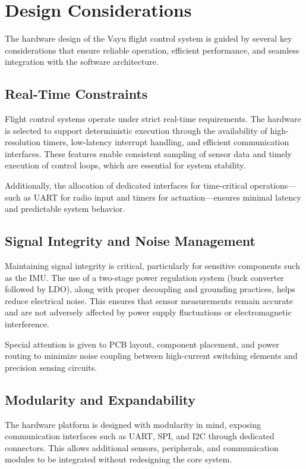 \section{Design Considerations}
\label{sec:hw_design}

The hardware design of the Vayu flight control system is guided by several key considerations that ensure reliable operation, efficient performance, and seamless integration with the software architecture.

\subsection{Real-Time Constraints}

Flight control systems operate under strict real-time requirements. The hardware is selected to support deterministic execution through the availability of high-resolution timers, low-latency interrupt handling, and efficient communication interfaces. These features enable consistent sampling of sensor data and timely execution of control loops, which are essential for system stability.

Additionally, the allocation of dedicated interfaces for time-critical operations—such as UART for radio input and timers for actuation—ensures minimal latency and predictable system behavior.

\subsection{Signal Integrity and Noise Management}

Maintaining signal integrity is critical, particularly for sensitive components such as the IMU. The use of a two-stage power regulation system (buck converter followed by LDO), along with proper decoupling and grounding practices, helps reduce electrical noise. This ensures that sensor measurements remain accurate and are not adversely affected by power supply fluctuations or electromagnetic interference.

Special attention is given to PCB layout, component placement, and power routing to minimize noise coupling between high-current switching elements and precision sensing circuits.

\subsection{Modularity and Expandability}

The hardware platform is designed with modularity in mind, exposing communication interfaces such as UART, SPI, and I2C through dedicated connectors. This allows additional sensors, peripherals, and communication modules to be integrated without redesigning the core system.

